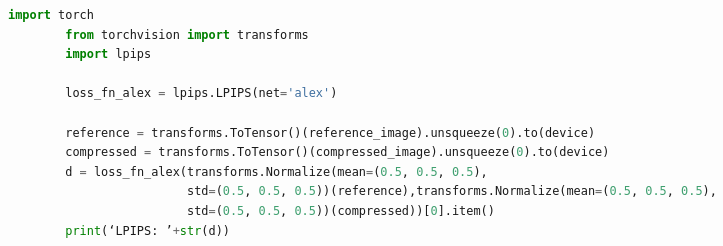 \begin{adjustbox}{max width=\textwidth}   
    \begin{lstlisting}[language=Python, caption=Spezzone di codice per il calcolo di LPIPS con AlexNet, label=code:LPIPSComputation]
        import torch
        from torchvision import transforms
        import lpips
        
        loss_fn_alex = lpips.LPIPS(net='alex')
        
        reference = transforms.ToTensor()(reference_image).unsqueeze(0).to(device)
        compressed = transforms.ToTensor()(compressed_image).unsqueeze(0).to(device)
        d = loss_fn_alex(transforms.Normalize(mean=(0.5, 0.5, 0.5),
                         std=(0.5, 0.5, 0.5))(reference),transforms.Normalize(mean=(0.5, 0.5, 0.5),
                         std=(0.5, 0.5, 0.5))(compressed))[0].item()
        print(‘LPIPS: ’+str(d))
    \end{lstlisting}
\end{adjustbox} 
    

